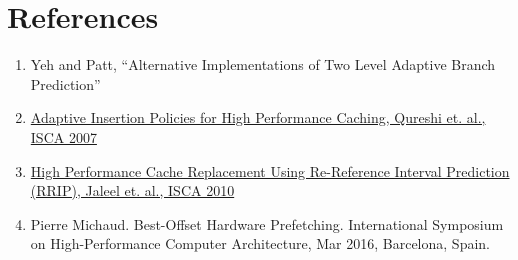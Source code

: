 \documentclass[a4paper]{article}
\begin{document}
\pagebreak
\section{References}
    \begin{enumerate}
        \item  Yeh and Patt, “Alternative Implementations of Two Level Adaptive Branch Prediction”
        \item \href{https://people.csail.mit.edu/emer/papers/2007.06.isca.dip.pdf}{Adaptive Insertion Policies for High Performance Caching, Qureshi et. al., ISCA 2007}
        \item \href{https://people.csail.mit.edu/emer/papers/2010.06.isca.rrip.pdf}{High Performance Cache Replacement Using Re-Reference Interval Prediction (RRIP), Jaleel et. al., ISCA 2010}
        \item Pierre Michaud. Best-Offset Hardware Prefetching. International Symposium on High-Performance Computer Architecture, Mar 2016, Barcelona, Spain.
    \end{enumerate}
        
            
\end{document}
